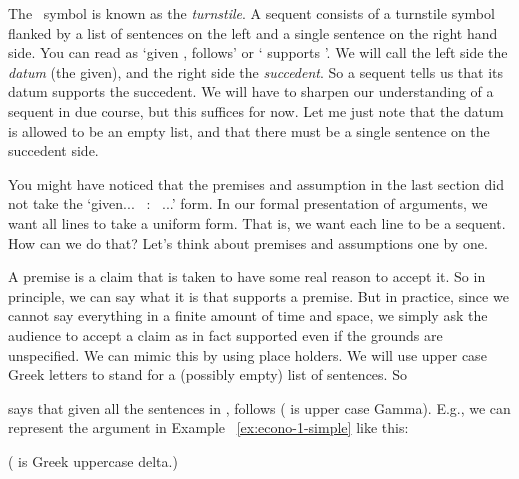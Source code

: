The \lproves~symbol is known as the \emph{turnstile}.  A  sequent consists of a 
turnstile symbol flanked by a list of sentences on the left and a single 
sentence on the right hand side. You can read  as `given ,  follows' or ` 
supports '.  We will call the left side the \emph{datum} (the given), and 
the right side the \emph{succedent}. So a sequent tells us that its datum 
supports the succedent.  We will have to sharpen our understanding of a sequent 
in due course, but this suffices for now. Let me just note that the datum is 
allowed to be an empty list, and that there must be a single sentence on the 
succedent side.

You might have noticed that the premises and assumption in the last section did 
not take the `given...~ :~ ...' form. In our formal presentation of arguments, 
we want all lines to take a uniform form. That is, we want each line to be a 
sequent. How can we do that? Let's think about premises and assumptions one by 
one.

A premise is a claim that is taken to have some real reason to accept it.  So in 
principle, we can say what it is that supports a premise. But in practice, since 
we cannot say everything in a finite amount of time and space, we simply ask the 
audience to accept a claim as in fact supported even if the grounds are 
unspecified. We can mimic this by using place holders.  We will use upper case 
Greek letters to stand for a (possibly empty) list of sentences.  So 

\begin{center}


\end{center}

says that given all the sentences in \p{\Gamma},  follows (\p{ \Gamma } is 
upper case Gamma).  E.g., we can represent the argument in Example~       
\ref{ex:econo-1-simple} like this:  

\begin{argument}

\aitem {}

\aitem {}

\aitem {}

\end{argument}

(\p{\Delta} is Greek uppercase delta.)


